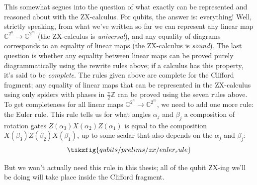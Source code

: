 This somewhat segues into the question of what exactly can be represented and reasoned about with the ZX-calculus.
For qubits, the answer is: everything!
Well, strictly speaking, from what we've written so far we can represent any linear map $\mathbb{C}^{2^n} \to \mathbb{C}^{2^m}$ (the ZX-calculus is \textit{universal}), and any equality of diagrams corresponds to an equality of linear maps (the ZX-calculus is \textit{sound}).
The last question is whether any equality between linear maps can be proved purely diagrammatically using the rewrite rules above; if a calculus has this property, it's said to be \textit{complete}.
The rules given above are complete for the Clifford fragment; any equality of linear maps that can be represented in the ZX-calculus using only spiders with phases in $\frac{\pi}{2}\mathbb{Z}$ can be proved using the seven rules above.
To get completeness for all linear maps $\mathbb{C}^{2^n} \to \mathbb{C}^{2^m}$, we need to add one more rule: the Euler rule.
This rule tells us for what angles $\alpha_j$ and $\beta_j$ a composition of rotation gates $Z(\alpha_3)X(\alpha_2)Z(\alpha_1)$ is equal to the composition $X(\beta_3)Z(\beta_2)X(\beta_1)$, up to some scalar that also depends on the $\alpha_j$ and $\beta_j$:
\begin{equation}\label{eq:euler_rule}
    \tikzfig{qubits/prelims/zx/euler_rule}
\end{equation}

But we won't actually need this rule in this thesis; all of the qubit ZX-ing we'll be doing will take place inside the Clifford fragment.

